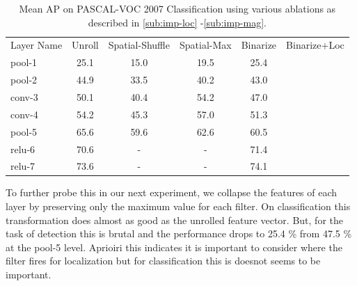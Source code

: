 \documentclass[runningheads]{llncs}
\begin{document}
\setlength{\tabcolsep}{4pt}
\begin{table}
\begin{center}
\caption{Mean AP on PASCAL-VOC 2007 Classification using various ablations as described in \ref{sub:imp-loc} -\ref{sub:imp-mag}.}
\label{table:class-loc-mag}
\begin{tabular}{lccccc}
\hline\noalign{\smallskip}
Layer Name & Unroll & Spatial-Shuffle & Spatial-Max & Binarize & Binarize+Loc\\
\noalign{\smallskip}
\hline
\noalign{\smallskip}
pool-1 & 25.1 & 15.0 & 19.5 & 25.4 \\
pool-2 & 44.9 & 33.5 & 40.2 & 43.0\\
conv-3 & 50.1 & 40.4 & 54.2 & 47.0\\
conv-4 & 54.2 & 45.3 & 57.0 & 51.3\\
pool-5 & 65.6 & 59.6 & 62.6 & 60.5\\
relu-6 & 70.6 &  -   &  -   & 71.4 \\
relu-7 & 73.6 &  -   &  -   & 74.1 \\
\hline
\end{tabular}
\end{center}
\end{table}
\setlength{\tabcolsep}{1.4pt}


To further probe this in our next experiment, we collapse the features of each layer by preserving only the maximum value for each filter. On classification this transformation does almost as good as the unrolled feature vector. But, for the task of detection this is brutal and the performance drops to 25.4 \% from 47.5 \% at the pool-5 level. Aprioiri this indicates it is important to consider where the filter fires for localization but for classification this is doesnot seems to be important. 
\end{document}
